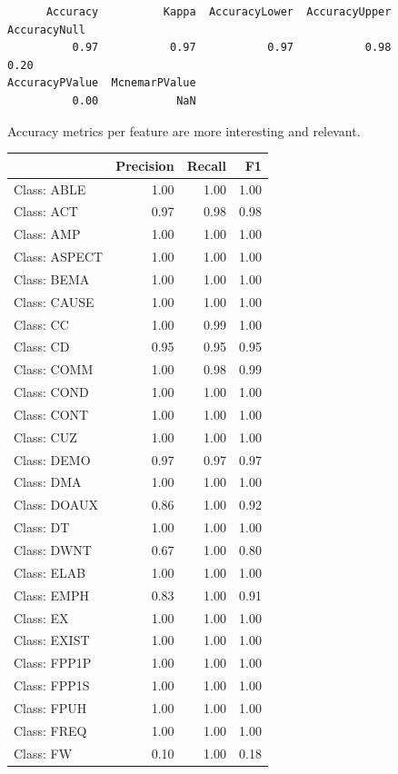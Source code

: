 \documentclass[
  letterpaper,
  DIV=11,
  numbers=noendperiod]{scrreprt}
\begin{document}
\begin{verbatim}
      Accuracy          Kappa  AccuracyLower  AccuracyUpper   AccuracyNull 
          0.97           0.97           0.97           0.98           0.20 
AccuracyPValue  McnemarPValue 
          0.00            NaN 
\end{verbatim}

Accuracy metrics per feature are more interesting and relevant.

\begin{longtable}[]{@{}lrrr@{}}
\toprule\noalign{}
& Precision & Recall & F1 \\
\midrule\noalign{}
\endhead
\bottomrule\noalign{}
\endlastfoot
Class: ABLE & 1.00 & 1.00 & 1.00 \\
Class: ACT & 0.97 & 0.98 & 0.98 \\
Class: AMP & 1.00 & 1.00 & 1.00 \\
Class: ASPECT & 1.00 & 1.00 & 1.00 \\
Class: BEMA & 1.00 & 1.00 & 1.00 \\
Class: CAUSE & 1.00 & 1.00 & 1.00 \\
Class: CC & 1.00 & 0.99 & 1.00 \\
Class: CD & 0.95 & 0.95 & 0.95 \\
Class: COMM & 1.00 & 0.98 & 0.99 \\
Class: COND & 1.00 & 1.00 & 1.00 \\
Class: CONT & 1.00 & 1.00 & 1.00 \\
Class: CUZ & 1.00 & 1.00 & 1.00 \\
Class: DEMO & 0.97 & 0.97 & 0.97 \\
Class: DMA & 1.00 & 1.00 & 1.00 \\
Class: DOAUX & 0.86 & 1.00 & 0.92 \\
Class: DT & 1.00 & 1.00 & 1.00 \\
Class: DWNT & 0.67 & 1.00 & 0.80 \\
Class: ELAB & 1.00 & 1.00 & 1.00 \\
Class: EMPH & 0.83 & 1.00 & 0.91 \\
Class: EX & 1.00 & 1.00 & 1.00 \\
Class: EXIST & 1.00 & 1.00 & 1.00 \\
Class: FPP1P & 1.00 & 1.00 & 1.00 \\
Class: FPP1S & 1.00 & 1.00 & 1.00 \\
Class: FPUH & 1.00 & 1.00 & 1.00 \\
Class: FREQ & 1.00 & 1.00 & 1.00 \\
Class: FW & 0.10 & 1.00 & 0.18 \\

\end{longtable}
\end{document}
